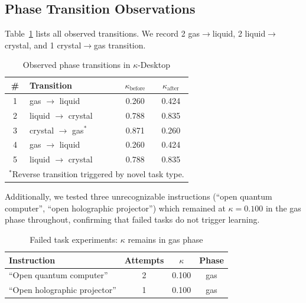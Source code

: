 \documentclass[10pt,twocolumn]{article}
\newcommand{\kap}{\kappa}
\newcommand{\kdes}{$\kappa$-Desktop}
\begin{document}
\vspace{1cm}

\subsection{Phase Transition Observations}

Table~\ref{tab:transitions} lists all observed transitions. 
We record 2 gas$\to$liquid, 2 liquid$\to$crystal, and 1 
crystal$\to$gas transition.

\begin{table}[htbp]
\centering
\caption{Observed phase transitions in \kdes{}}
\label{tab:transitions}
\begin{tabular}{clcc}
\toprule
\# & Transition & $\kap_{\text{before}}$ & 
  $\kap_{\text{after}}$ \\
\midrule
1 & gas $\to$ liquid & 0.260 & 0.424 \\
2 & liquid $\to$ crystal & 0.788 & 0.835 \\
3 & crystal $\to$ gas$^*$ & 0.871 & 0.260 \\
4 & gas $\to$ liquid & 0.260 & 0.424 \\
5 & liquid $\to$ crystal & 0.788 & 0.835 \\
\bottomrule
\multicolumn{4}{l}{\footnotesize $^*$Reverse transition 
  triggered by novel task type.}
\end{tabular}
\end{table}

\vspace{1cm}

Additionally, we tested three unrecognizable instructions 
(``open quantum computer'', ``open holographic projector'') 
which remained at $\kap = 0.100$ in the gas phase 
throughout, confirming that failed tasks do not trigger 
learning.

\begin{table}[htbp]
\centering
\caption{Failed task experiments: $\kappa$ remains in gas 
  phase}
\label{tab:failed}
\begin{tabular}{lccc}
\toprule
Instruction & Attempts & $\kappa$ & Phase \\
\midrule
``Open quantum computer'' & 2 & 0.100 & gas \\
``Open holographic projector'' & 1 & 0.100 & gas \\
\bottomrule
\end{tabular}
\end{table}

\vspace{1cm}
\end{document}
